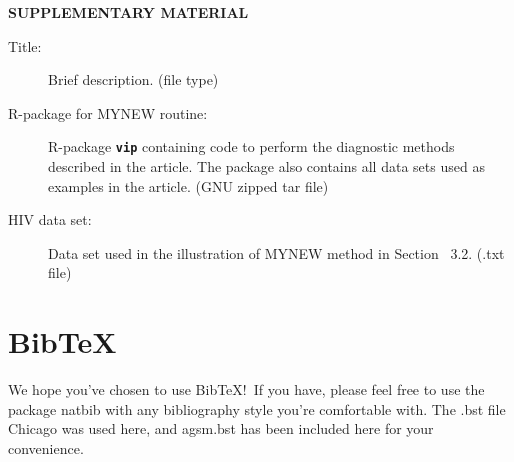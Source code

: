 \documentclass[12pt]{article}
\def\pkg#1{\textbf{\texttt{#1}}}
\begin{document}

\bigskip
\begin{center}
{\large\bf SUPPLEMENTARY MATERIAL}
\end{center}

\begin{description}

\item[Title:] Brief description. (file type)

\item[R-package for  MYNEW routine:] R-package \pkg{vip} containing code to perform the diagnostic methods described in the article. The package also contains all data sets used as examples in the article. (GNU zipped tar file)

\item[HIV data set:] Data set used in the illustration of MYNEW method in Section~ 3.2. (.txt file)

\end{description}


\section{BibTeX}

We hope you've chosen to use BibTeX!\ If you have, please feel free to use the package natbib with any bibliography style you're comfortable with. The .bst file Chicago was used here, and agsm.bst has been included here for your convenience.




\end{document}
